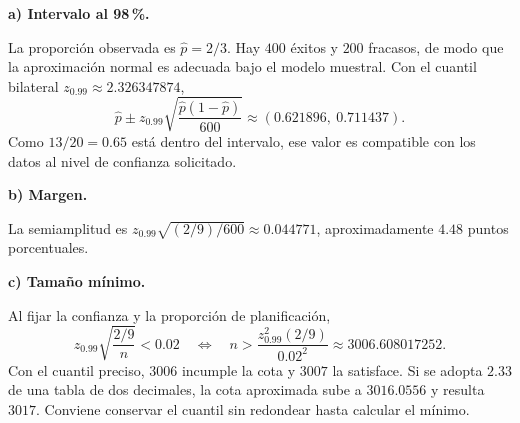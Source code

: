 \textbf{a) Intervalo al 98\,\%.}\par\nopagebreak[4]
La proporción observada es $\hat p=2/3$. Hay $400$ éxitos y $200$ fracasos, de modo que la aproximación normal es adecuada bajo el modelo muestral. Con el cuantil bilateral $z_{0.99}\approx2.326347874$,
\[
\hat p\pm z_{0.99}\sqrt{\frac{\hat p(1-\hat p)}{600}}
\approx\boxed{(0.621896,\ 0.711437)}.
\]
Como $13/20=0.65$ está dentro del intervalo, ese valor es compatible con los datos al nivel de confianza solicitado.

\textbf{b) Margen.}\par\nopagebreak[4]
La semiamplitud es $z_{0.99}\sqrt{(2/9)/600}\approx\boxed{0.044771}$, aproximadamente $4.48$ puntos porcentuales.

\textbf{c) Tamaño mínimo.}\par\nopagebreak[4]
Al fijar la confianza y la proporción de planificación,
\[
z_{0.99}\sqrt{\frac{2/9}{n}}<0.02
\quad\Longleftrightarrow\quad
n>\frac{z_{0.99}^2(2/9)}{0.02^2}\approx3006.608017252.
\]
Con el cuantil preciso, $3006$ incumple la cota y $\boxed{3007}$ la satisface. Si se adopta $2.33$ de una tabla de dos decimales, la cota aproximada sube a $3016.0556$ y resulta $3017$. Conviene conservar el cuantil sin redondear hasta calcular el mínimo.
